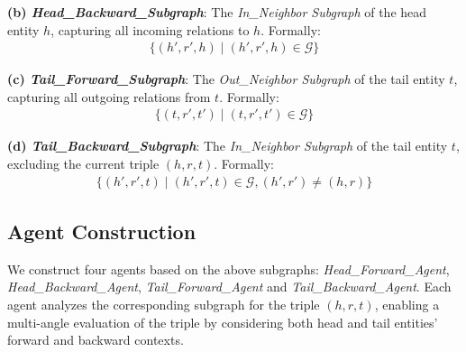 \noindent\textbf{(b) \textit{Head\_Backward\_Subgraph}}: The \textit{In\_Neighbor Subgraph} of the head entity \( h \), capturing all incoming relations to \( h \). Formally:
\begin{align}
   \{(h', r', h) \mid (h', r', h) \in \mathcal{G} \}
\end{align}

\noindent\textbf{(c) \textit{Tail\_Forward\_Subgraph}}: The \textit{Out\_Neighbor Subgraph} of the tail entity \( t \), capturing all outgoing relations from \( t \). Formally:
\begin{align}
   \{(t, r', t') \mid (t, r', t') \in \mathcal{G}\}
\end{align}

\noindent\textbf{(d) \textit{Tail\_Backward\_Subgraph}}: The \textit{In\_Neighbor Subgraph} of the tail entity \( t \), excluding the current triple \( (h, r, t) \). Formally:
\begin{align}
   \{(h', r', t) \mid (h', r', t) \in \mathcal{G}, (h', r') \neq (h, r)\}
\end{align}


\subsection{Agent Construction}

We construct four agents based on the above subgraphs: 
\textit{Head\_Forward\_Agent}, \textit{Head\_Backward\_Agent}, \textit{Tail\_Forward\_Agent} and \textit{Tail\_Backward\_Agent}.
Each agent analyzes the corresponding subgraph for the triple \( (h, r, t) \), enabling a multi-angle evaluation of the triple by considering both head and tail entities' forward and backward contexts.


